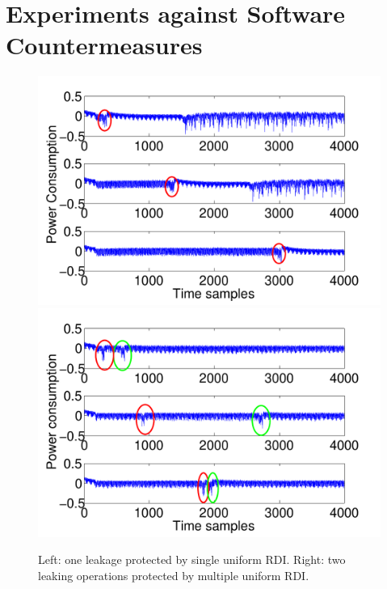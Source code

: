 \section{Experiments against Software Countermeasures}

\begin{figure}
\includegraphics[width=.5\textwidth]{../Figures/CHES2017/CW_shift_traces.pdf} 
\includegraphics[width=.5\textwidth]{../Figures/CHES2017/CW_double_shift_traces.pdf} 
\caption{Left: one leakage protected by single uniform RDI. Right: two leaking operations protected by multiple uniform RDI.}\label{fig:CW_shift_traces}
\end{figure}

